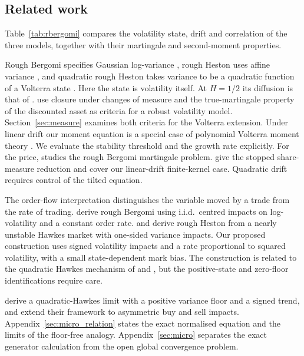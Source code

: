 \documentclass{rQUF2e}
\theoremstyle{plain}
\theoremstyle{definition}
\theoremstyle{remark}
\begin{document}
\subsection{Related work}\label{sec:literature}
Table~\ref{tab:rbergomi} compares the volatility state, drift and correlation of the three models, together with their martingale and second-moment properties.

Rough Bergomi specifies Gaussian log-variance \citep{BayerFrizGatheral2016}, rough Heston uses affine variance \citep{ElEuchRosenbaum2019}, and quadratic rough Heston takes variance to be a quadratic function of a Volterra state \citep{GatheralJusselinRosenbaum2020}. Here the state is volatility itself. At $H=1/2$ its diffusion is that of \citet{SeppRakhmonov2023}. \citet{SeppRakhmonov2026} use closure under changes of measure and the true-martingale property of the discounted asset as criteria for a robust volatility model. Section~\ref{sec:measure} examines both criteria for the Volterra extension. Under linear drift our moment equation is a special case of polynomial Volterra moment theory \citep{AbiJaberCuchieroPelizzariPulidoSvalutoFerro2024}. We evaluate the stability threshold and the growth rate explicitly. For the price, \citet{Gassiat2019} studies the rough Bergomi martingale problem. \citet{GuyonJeanninJourdain2026} give the stopped share-measure reduction and cover our linear-drift finite-kernel case. Quadratic drift requires control of the tilted equation.

The order-flow interpretation distinguishes the variable moved by a trade from the rate of trading. \citet{HagerHorstWagenhoferXu2026} derive rough Bergomi using i.i.d.\ centred impacts on log-volatility and a constant order rate. \citet{JaissonRosenbaum2016} and \citet{ElEuchFukasawaRosenbaum2018} derive rough Heston from a nearly unstable Hawkes market with one-sided variance impacts. Our proposed construction uses signed volatility impacts and a rate proportional to squared volatility, with a small state-dependent mark bias. The construction is related to the quadratic Hawkes mechanism of \citet{BlancDonierBouchaud2017} and \citet{DandapaniJusselinRosenbaum2021}, but the positive-state and zero-floor identifications require care.

\citet{DandapaniJusselinRosenbaum2021} derive a quadratic-Hawkes limit with a positive variance floor and a signed trend, and \citet{ChudasamaIyer2025} extend their framework to asymmetric buy and sell impacts. Appendix~\ref{sec:micro_relation} states the exact normalised equation and the limits of the floor-free analogy.
Appendix~\ref{sec:micro} separates the exact generator calculation from the open global convergence problem.
\end{document}
